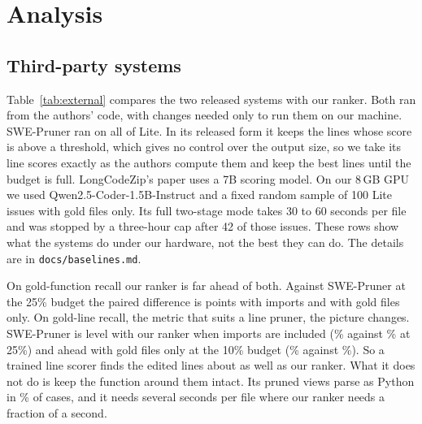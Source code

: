 \section{Analysis}
\label{sec:analysis}

\subsection{Third-party systems}
\label{sec:external}

\begin{table}[t]
\caption{Third-party systems on SWE-bench Lite, and LongCodeZip's ranking criterion on our units (AST + LLM perplexity), each next to our trained ranker on exactly the issues it ran on. Recall cells are theirs / ours, in percent. The difference is paired over the same issues, with a 95\% bootstrap interval. Seconds per file include model scoring on our laptop GPU.}
\label{tab:external}
\centering
\scriptsize
\setlength{\tabcolsep}{3pt}
\end{table}

Table~\ref{tab:external} compares the two released systems with our ranker. Both ran from the authors' code, with changes needed only to run them on our machine. SWE-Pruner ran on all of Lite. In its released form it keeps the lines whose score is above a threshold, which gives no control over the output size, so we take its line scores exactly as the authors compute them and keep the best lines until the budget is full. LongCodeZip's paper uses a 7B scoring model. On our 8\,GB GPU we used Qwen2.5-Coder-1.5B-Instruct and a fixed random sample of 100 Lite issues with gold files only. Its full two-stage mode takes 30 to 60 seconds per file and was stopped by a three-hour cap after 42 of those issues. These rows show what the systems do under our hardware, not the best they can do. The details are in \texttt{docs/baselines.md}.

On gold-function recall our ranker is far ahead of both. Against SWE-Pruner at the 25\% budget the paired difference is  points with imports and  with gold files only. On gold-line recall, the metric that suits a line pruner, the picture changes. SWE-Pruner is level with our ranker when imports are included (\% against \% at 25\%) and ahead with gold files only at the 10\% budget (\% against \%). So a trained line scorer finds the edited lines about as well as our ranker. What it does not do is keep the function around them intact. Its pruned views parse as Python in \% of cases, and it needs several seconds per file where our ranker needs a fraction of a second.

